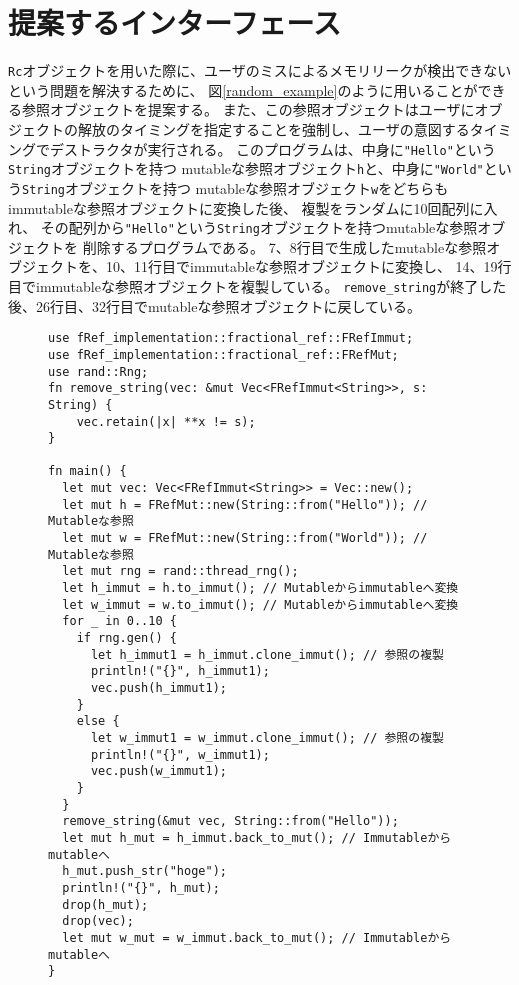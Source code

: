\documentclass{sumiilab-paper}
\theoremstyle{mystyle}
\numberwithin{definition}{chapter} %
\begin{document}
\section{提案するインターフェース}
\texttt{Rc}オブジェクトを用いた際に、ユーザのミスによるメモリリークが検出できない
という問題を解決するために、
図\ref{random_example}のように用いることができる参照オブジェクトを提案する。
また、この参照オブジェクトはユーザにオブジェクトの解放のタイミングを指定することを強制し、ユーザの意図するタイミングでデストラクタが実行される。
このプログラムは、中身に\texttt{"Hello"}という\texttt{String}オブジェクトを持つ
mutableな参照オブジェクト\texttt{h}と、中身に\texttt{"World"}という\texttt{String}オブジェクトを持つ
mutableな参照オブジェクト\texttt{w}をどちらもimmutableな参照オブジェクトに変換した後、
複製をランダムに10回配列に入れ、
その配列から\texttt{"Hello"}という\texttt{String}オブジェクトを持つmutableな参照オブジェクトを
削除するプログラムである。
7、8行目で生成したmutableな参照オブジェクトを、10、11行目でimmutableな参照オブジェクトに変換し、
14、19行目でimmutableな参照オブジェクトを複製している。
\texttt{remove\_string}が終了した後、26行目、32行目でmutableな参照オブジェクトに戻している。
\begin{figure}[htp]
\begin{lstlisting}[caption=新たな参照オブジェクトを用いた柔軟なメモリ管理の例, 
  label=random_example, captionpos=b]
use fRef_implementation::fractional_ref::FRefImmut;
use fRef_implementation::fractional_ref::FRefMut;
use rand::Rng;
fn remove_string(vec: &mut Vec<FRefImmut<String>>, s: String) {
    vec.retain(|x| **x != s);
}

fn main() {
  let mut vec: Vec<FRefImmut<String>> = Vec::new();
  let mut h = FRefMut::new(String::from("Hello")); // Mutableな参照
  let mut w = FRefMut::new(String::from("World")); // Mutableな参照
  let mut rng = rand::thread_rng();
  let h_immut = h.to_immut(); // Mutableからimmutableへ変換
  let w_immut = w.to_immut(); // Mutableからimmutableへ変換
  for _ in 0..10 {
    if rng.gen() {
      let h_immut1 = h_immut.clone_immut(); // 参照の複製
      println!("{}", h_immut1);
      vec.push(h_immut1);
    }
    else {
      let w_immut1 = w_immut.clone_immut(); // 参照の複製
      println!("{}", w_immut1);
      vec.push(w_immut1);
    }
  }
  remove_string(&mut vec, String::from("Hello"));
  let mut h_mut = h_immut.back_to_mut(); // Immutableからmutableへ
  h_mut.push_str("hoge");
  println!("{}", h_mut);
  drop(h_mut);
  drop(vec);
  let mut w_mut = w_immut.back_to_mut(); // Immutableからmutableへ
}
\end{lstlisting}
\end{figure}
\end{document}
